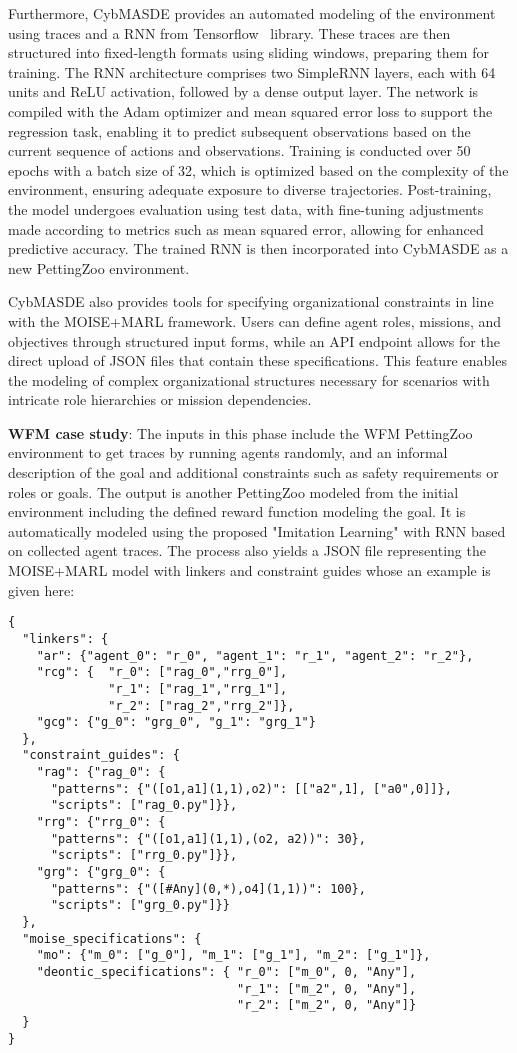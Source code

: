 \documentclass[sigconf,anonymous]{aamas}
\begin{document}
Furthermore, CybMASDE provides an automated modeling of the environment using traces and a RNN from Tensorflow~\cite{tensorflow2015-whitepaper} library.
These traces are then structured into fixed-length formats using sliding windows, preparing them for training. The RNN architecture comprises two SimpleRNN layers, each with 64 units and ReLU activation, followed by a dense output layer. The network is compiled with the Adam optimizer and mean squared error loss to support the regression task, enabling it to predict subsequent observations based on the current sequence of actions and observations. Training is conducted over 50 epochs with a batch size of 32, which is optimized based on the complexity of the environment, ensuring adequate exposure to diverse trajectories. Post-training, the model undergoes evaluation using test data, with fine-tuning adjustments made according to metrics such as mean squared error, allowing for enhanced predictive accuracy. The trained RNN is then incorporated into CybMASDE as a new PettingZoo environment.

CybMASDE also provides tools for specifying organizational constraints in line with the MOISE+MARL framework. Users can define agent roles, missions, and objectives through structured input forms, while an API endpoint allows for the direct upload of JSON files that contain these specifications. This feature enables the modeling of complex organizational structures necessary for scenarios with intricate role hierarchies or mission dependencies.

\textbf{WFM case study}: The inputs in this phase include the WFM PettingZoo environment to get traces by running agents randomly, and an informal description of the goal and additional constraints such as safety requirements or roles or goals. The output is another PettingZoo modeled from the initial environment including the defined reward function modeling the goal. It is automatically modeled using the proposed "Imitation Learning" with RNN based on collected agent traces. The process also yields a JSON file representing the MOISE+MARL model with linkers and constraint guides whose an example is given here:

{
\footnotesize
\begin{verbatim}
{
  "linkers": {
    "ar": {"agent_0": "r_0", "agent_1": "r_1", "agent_2": "r_2"},
    "rcg": {  "r_0": ["rag_0","rrg_0"],
              "r_1": ["rag_1","rrg_1"],
              "r_2": ["rag_2","rrg_2"]},
    "gcg": {"g_0": "grg_0", "g_1": "grg_1"}
  },
  "constraint_guides": {
    "rag": {"rag_0": {
      "patterns": {"([o1,a1](1,1),o2)": [["a2",1], ["a0",0]]},
      "scripts": ["rag_0.py"]}},
    "rrg": {"rrg_0": {
      "patterns": {"([o1,a1](1,1),(o2, a2))": 30},
      "scripts": ["rrg_0.py"]}},
    "grg": {"grg_0": {
      "patterns": {"([#Any](0,*),o4](1,1))": 100},
      "scripts": ["grg_0.py"]}}
  },
  "moise_specifications": {
    "mo": {"m_0": ["g_0"], "m_1": ["g_1"], "m_2": ["g_1"]},
    "deontic_specifications": { "r_0": ["m_0", 0, "Any"],
                                "r_1": ["m_2", 0, "Any"],
                                "r_2": ["m_2", 0, "Any"]}
  }
}
\end{verbatim}
}
\end{document}
